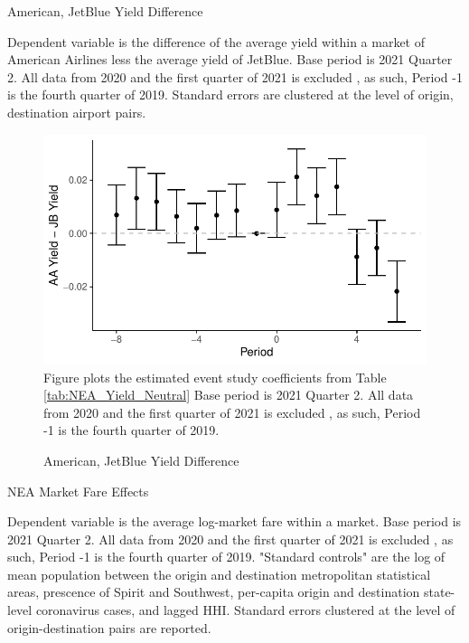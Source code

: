 \documentclass{article}
\begin{document}
\begin{appendices}
	\begin{table}
		\caption{American, JetBlue Yield Difference}
		\label{tab:NEA_Yield_Neutral}
		
		\footnotesize{Dependent variable is the difference of the average yield within a market of American Airlines less the average yield of JetBlue. Base period is 2021 Quarter 2. All data from 2020 and the first quarter of 2021 is excluded , as such,  Period -1 is the fourth quarter of 2019. Standard errors are clustered at the level of origin, destination airport pairs.}
	\end{table}
	
	\begin{figure}
		\caption{American, JetBlue Yield Difference}
		\label{fig:NEA_Yield_Neutral}
		\includegraphics[width = \linewidth]{NEA_Price_Neutrality_Graph_Y}
		\footnotesize{Figure plots the estimated event study coefficients from Table \ref{tab:NEA_Yield_Neutral} Base period is 2021 Quarter 2. All data from 2020 and the first quarter of 2021 is excluded , as such,  Period -1 is the fourth quarter of 2019.}
	\end{figure}
	
	\begin{table}
		\caption{NEA Market Fare Effects}
		\label{tab:NEA_Market_Fare}
		
		\footnotesize{Dependent variable is the average log-market fare within a market. Base period is 2021 Quarter 2. All data from 2020 and the first quarter of 2021 is excluded , as such,  Period -1 is the fourth quarter of 2019. "Standard controls" are the log of mean population between the origin and destination metropolitan statistical areas, prescence of Spirit and Southwest, per-capita origin and destination state-level coronavirus cases, and lagged HHI. Standard errors clustered at the level of origin-destination pairs are reported.  }
	\end{table}
	

\end{appendices}
\end{document}
